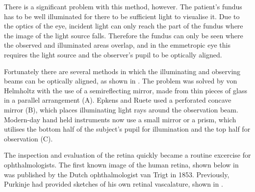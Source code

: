 

There is a significant problem with this method, however.  The patient's fundus has to be well illuminated for there to be sufficient light to visualise it.  Due to the optics of the eye, incident light can only reach the part of the fundus where the image of the light source falls.  Therefore the fundus can only be seen where the observed and illuminated areas overlap, and in the emmetropic eye this requires the light source and the observer's pupil to be optically aligned.

Fortunately there are several methods in which the illuminating and observing beams can be optically aligned, as shown in .  The problem was solved by von Helmholtz with the use of a semireflecting mirror, made from thin pieces of glass in a parallel arrangement (A).  Epkens and Ruete used a perforated concave mirror (B), which places illuminating light rays around the observation beam.  Modern-day hand held instruments now use a small mirror or a prism, which utilises the bottom half of the subject's pupil for illumination and the top half for observation (C).




The inspection and evaluation of the retina quickly became a routine excercise for ophthalmologists.  The first known image of the human retina, shown below in  was published by the Dutch ophthalmologist van Trigt in 1853.  Previously, Purkinje had provided sketches of his own retinal vascalature, shown in .

%

